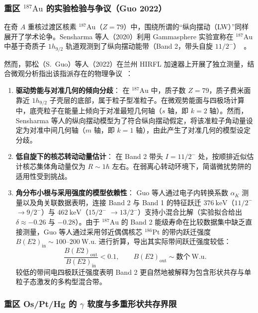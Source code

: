 \subsubsection{重区 $^{187}\mathrm{Au}$ 的实验检验与争议（Guo 2022）}

在奇 $A$ 重核过渡区核素 $^{187}\mathrm{Au}$（$Z=79$）中，围绕所谓的“纵向摆动（LW）”同样展开了学术论争。Sensharma 等人（2020）利用 Gammasphere 实验宣称在 $^{187}\mathrm{Au}$ 中基于奇质子 $1h_{9/2}$ 轨道观测到了纵向摆动能带（Band 2，带头自旋 $11/2^-$）~\cite{sensharma-2020-longitudinal-wobbling-187au}。

然而，郭松（S.~Guo）等人（2022）在兰州 HIRFL 加速器上开展了独立测量，结合微观分析指出该指派存在的物理争议~\cite{guo-2022-low-spin-wobbling-187au}：
\begin{enumerate}
\item \textbf{驱动势能与对准几何的倾向分歧}：
在 $^{187}\mathrm{Au}$ 中，质子数 $Z=79$，质子费米面靠近 $1h_{9/2}$ 子壳层的底部，属于粒子型准粒子。在微观势能面与四极场计算中，底壳粒子在能量上倾向于对准最短几何轴（$s$ 轴，即 $k=2$ 轴）。然而，Sensharma 等人的纵向摆动模型为了符合纵向摆动假定，将该准粒子角动量设定为对准中间几何轴（$m$ 轴，即 $k=1$ 轴），由此产生了对准几何的模型设定分歧。
\item \textbf{低自旋下的核芯转动动量估计}：
在 Band 2 带头 $I = 11/2^-$ 处，按顺排近似估计核芯集体角动量仅为 $R \sim 1\hbar$ 左右。在弱离心转动环境下，简谐微扰势阱的适用性受到挑战。
\item \textbf{角分布小根与采用强度的模型依赖性}：
Guo 等人通过电子内转换系数 $\alpha_K$ 测量以及角关联数据表明，连接 Band 2 与 Band 1 的特征跃迁 $376\ \mathrm{keV}$（$11/2^-$ $\to 9/2^-$）与 $462\ \mathrm{keV}$（$15/2^-$ $\to 13/2^-$）支持小混合比解（实验拟合给出 $\delta \approx -0.26$ 与 $-0.28$）。由于 $^{187}\mathrm{Au}$ 的 Band 2 能级寿命在比较数据集中缺乏直接测量，Guo 等人通过采用邻近偶偶核芯 $^{186}\mathrm{Pt}$ 的带内跃迁强度 $B(E2)_{\mathrm{in}} \sim 100$--$200\ \mathrm{W.u.}$ 进行折算，导出其实际带间跃迁强度较低：
\begin{equation}\label{eq:4-4-au187-be2-ratio}
\frac{B(E2)_{\mathrm{out}}}{B(E2)_{\mathrm{in}}} < 0.1, \qquad B(E2)_{\mathrm{out}} \sim \text{数个}\ \mathrm{W.u.}
\end{equation}
较低的带间电四极跃迁强度表明 Band 2 更自然地被解释为包含形状共存与单粒子态激发的多构型混合带。
\end{enumerate}

\subsubsection{重区 Os/Pt/Hg 的 $\gamma$ 软度与多重形状共存界限}

